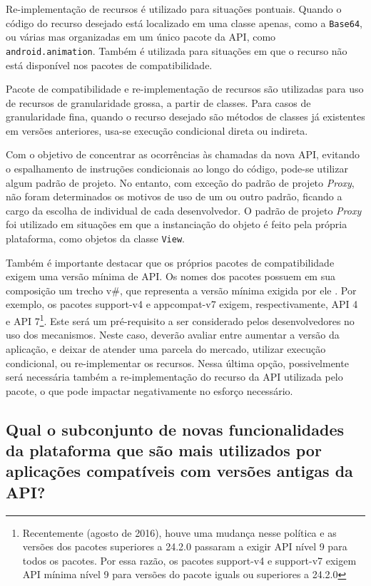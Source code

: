 Re-implementação de recursos é utilizado para situações pontuais. Quando o código do
recurso desejado está localizado em uma classe apenas, como a \texttt{Base64},  ou
várias mas organizadas em um único pacote da API, como \texttt{android.animation}.
Também é utilizada para situações em que o recurso não está disponível nos pacotes
de compatibilidade.

Pacote de compatibilidade e re-implementação de recursos são utilizadas para uso de
recursos de granularidade grossa, a partir de classes. Para casos de granularidade
fina, quando o recurso desejado são métodos de classes já existentes em versões
anteriores, usa-se execução condicional direta ou indireta.

Com o objetivo de concentrar as ocorrências às chamadas da nova API, evitando o
espalhamento de instruções condicionais ao longo do código, pode-se utilizar algum
padrão de projeto. No entanto, com exceção do padrão de projeto \textit{Proxy},
não foram determinados os motivos de uso de um ou outro padrão, ficando a cargo da
escolha de individual de cada desenvolvedor. O padrão de projeto \textit{Proxy} foi
utilizado em situações em que a instanciação do objeto é feito pela própria plataforma,
como objetos da classe \texttt{View}.

Também é importante destacar que os próprios pacotes de compatibilidade exigem uma
versão mínima de API. Os nomes dos pacotes possuem em sua composição um trecho v\#,
que representa a versão mínima exigida por ele \cite{SupportLibrary2017}. 
Por exemplo, os pacotes support-v4 e appcompat-v7 exigem, respectivamente, API 4 e
API 7\footnote{Recentemente (agosto de 2016), houve uma mudança nesse política e
as versões dos pacotes superiores a 24.2.0 passaram a exigir API nível 9 para todos
os pacotes. Por essa razão, os pacotes support-v4 e support-v7 exigem API mínima nível
9 para versões do pacote iguals ou superiores a 24.2.0}. Este será um pré-requisito a
ser considerado pelos desenvolvedores no uso dos mecanismos. Neste caso, deverão avaliar
entre aumentar a versão da aplicação, e deixar de atender uma parcela do mercado, utilizar
execução condicional, ou re-implementar os recursos. Nessa última opção, possivelmente será
necessária também a re-implementação do recurso da API utilizada pelo pacote, o que pode
impactar negativamente no esforço necessário.   

\subsection{Qual o subconjunto de novas funcionalidades da plataforma que são mais
utilizados por aplicações compatíveis com versões antigas da API?} \label{subsec:mudancas}

